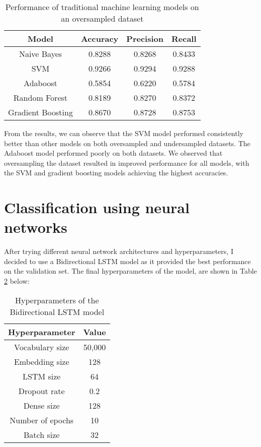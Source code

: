 \documentclass[12pt, a4paper]{article}
\begin{document}
\newline
\begin{center}
\begin{table}[ht]
\centering
\begin{tabular}{|c|c|c|c|}
\hline
\textbf{Model} & \textbf{Accuracy} & \textbf{Precision} & \textbf{Recall} \\
\hline
Naive Bayes & 0.8288 & 0.8268 & 0.8433 \\
SVM & 0.9266 & 0.9294 & 0.9288 \\
Adaboost & 0.5854 & 0.6220 & 0.5784 \\
Random Forest & 0.8189 & 0.8270 & 0.8372 \\
Gradient Boosting & 0.8670 & 0.8728 & 0.8753 \\
\hline
\end{tabular}
\caption{Performance of traditional machine learning models on an oversampled dataset}
\label{tab:traditional_oversampled_results}
\end{table}
\end{center}

\newline
From the results, we can observe that the SVM model performed consistently better than other models on both oversampled and undersampled datasets. The Adaboost model performed poorly on both datasets. We observed that oversampling the dataset resulted in improved performance for all models, with the SVM and gradient boosting models achieving the highest accuracies.






\section{Classification using neural networks}
After trying different neural network architectures and hyperparameters, I decided to use a Bidirectional LSTM model as it provided the best performance on the validation set. The final hyperparameters of the model, are shown in Table \ref{tab:bilstm_hyperparameters} below:
\newline

\begin{table}[htp]
\centering
\label{tab:bilstm_hyperparameters}
\begin{tabular}{c c} 
 \hline
 Hyperparameter & Value \\ [0.5ex] 
 \hline\hline
Vocabulary size & 50,000 \\
Embedding size & 128 \\
LSTM size & 64 \\
Dropout rate & 0.2 \\
Dense size & 128 \\
Number of epochs & 10 \\
Batch size & 32 \\
 \hline
\end{tabular}
\caption{Hyperparameters of the Bidirectional LSTM model}
\end{table}
\end{document}
